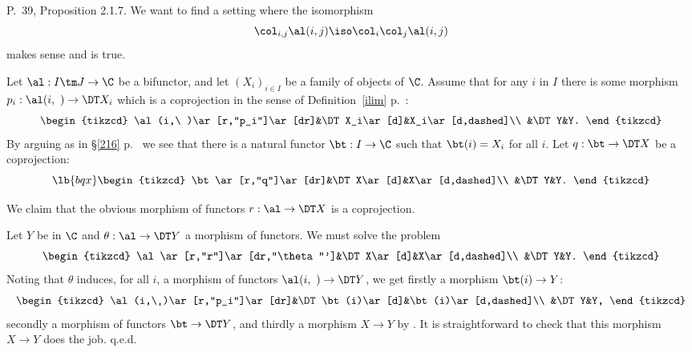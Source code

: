 \documentclass[12pt]{article}
\theoremstyle{remark}
\theoremstyle{definition}
\begin{document}
%

\begin{s}
P.~39, Proposition 2.1.7. We want to find a setting where the isomorphism 
$$
\col_{i,j}\al(i,j)\iso\col_i\col_j\al(i,j)
$$ 
makes sense and is true.

Let $\al:I\tm J\to\C$ be a bifunctor, and let $(X_i)_{i\in I}$ be a family of objects of $\C$. Assume that for any $i$ in $I$ there is some morphism $p_i:\al(i,\ )\to\DT X_i$ which is a coprojection in the sense of Definition~\ref{ilim} p.~: 
$$
\begin{tikzcd}
\al(i,\ )\ar[r,"p_i"]\ar[dr]&\DT X_i\ar[d]&X_i\ar[d,dashed]\\ 
&\DT Y&Y.
\end{tikzcd}
$$ 
By arguing as in \S\ref{216} p.~ we see that there is a natural functor $\bt:I\to\C$ such that $\bt(i)=X_i$ for all $i$. Let $q:\bt\to\DT X$ be a coprojection: 
\begin{equation}\lb{bqx}
\begin{tikzcd}
\bt\ar[r,"q"]\ar[dr]&\DT X\ar[d]&X\ar[d,dashed]\\ 
&\DT Y&Y.
\end{tikzcd}
\end{equation} 

We claim that the obvious morphism of functors $r:\al\to\DT X$ is a coprojection. 

Let $Y$ be in $\C$ and $\theta:\al\to\DT Y$ a morphism of functors. We must solve the problem 
$$
\begin{tikzcd}
\al\ar[r,"r"]\ar[dr,"\theta"']&\DT X\ar[d]&X\ar[d,dashed]\\ 
&\DT Y&Y.
\end{tikzcd}
$$ 
Noting that $\theta$ induces, for all $i$, a morphism of functors $\al(i,\ )\to\DT Y$, we get firstly a morphism $\bt(i)\to Y$:
$$
\begin{tikzcd}
\al(i,\ )\ar[r,"p_i"]\ar[dr]&\DT\bt(i)\ar[d]&\bt(i)\ar[d,dashed]\\ 
&\DT Y&Y,
\end{tikzcd}
$$ 
secondly a morphism of functors $\bt\to\DT Y$, and thirdly a morphism $X\to Y$ by . It is straightforward to check that this morphism $X\to Y$ does the job. q.e.d.
\end{s}

%
\end{document}
